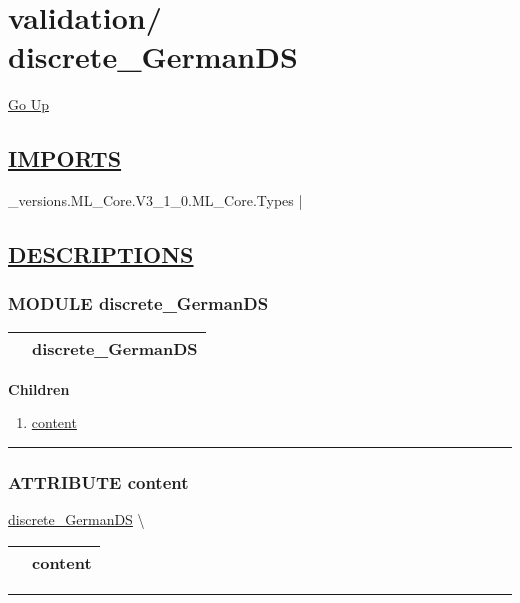 \chapter*{\color{headfile}
{\large validation\slash\hspace{0pt}}
 \\
discrete_GermanDS
}
\hypertarget{ecldoc:toc:validation.discrete_GermanDS}{}
\hyperlink{ecldoc:toc:root/validation}{Go Up}

\section*{\underline{\textsf{IMPORTS}}}
\begin{doublespace}
{\large
\_versions.ML\_Core.V3\_1\_0.ML\_Core.Types |
}
\end{doublespace}

\section*{\underline{\textsf{DESCRIPTIONS}}}
\subsection*{\textsf{\colorbox{headtoc}{\color{white} MODULE}
discrete\_GermanDS}}

\hypertarget{ecldoc:validation.discrete_GermanDS}{}

{\renewcommand{\arraystretch}{1.5}
\begin{tabularx}{\textwidth}{|>{\raggedright\arraybackslash}l|X|}
\hline
\hspace{0pt}\mytexttt{\color{red} } & \textbf{discrete\_GermanDS} \\
\hline
\end{tabularx}
}

\par


\textbf{Children}
\begin{enumerate}
\item \hyperlink{ecldoc:validation.discrete_germands.content}{content}
\end{enumerate}

\rule{\linewidth}{0.5pt}

\subsection*{\textsf{\colorbox{headtoc}{\color{white} ATTRIBUTE}
content}}

\hypertarget{ecldoc:validation.discrete_germands.content}{}
\hspace{0pt} \hyperlink{ecldoc:validation.discrete_GermanDS}{discrete_GermanDS} \textbackslash 

{\renewcommand{\arraystretch}{1.5}
\begin{tabularx}{\textwidth}{|>{\raggedright\arraybackslash}l|X|}
\hline
\hspace{0pt}\mytexttt{\color{red} } & \textbf{content} \\
\hline
\end{tabularx}
}

\par


\rule{\linewidth}{0.5pt}


